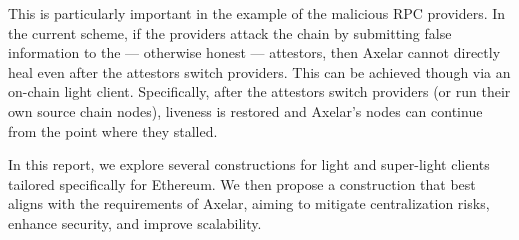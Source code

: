 This is particularly important in the example of the malicious RPC providers. In the current scheme, if the providers attack the chain by submitting false information to the --- otherwise honest --- attestors, then Axelar cannot directly heal even after the attestors switch providers. This can be achieved though via an on-chain light client. Specifically, after the attestors switch providers (or run their own source chain nodes), liveness is restored and Axelar's nodes can continue from the point where they stalled.

In this report, we explore several constructions for light and super-light clients tailored specifically for Ethereum. We then propose a construction that best aligns with the requirements of Axelar, aiming to mitigate centralization risks, enhance security, and improve scalability.
